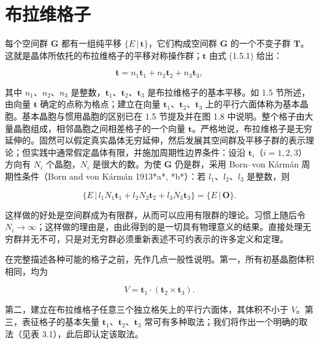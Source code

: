 \section{布拉维格子}

每个空间群 $\mathbf{G}$ 都有一组纯平移 $\{E \,|\, \mathbf{t}\}$，它们构成空间群 $\mathbf{G}$ 的一个不变子群 $\mathbf{T}$。这就是晶体所依托的布拉维格子的平移对称操作群；$\mathbf{t}$ 由式 (1.5.1) 给出：

\begin{equation*}
\mathbf{t} = n_{1}\mathbf{t}_{1} + n_{2}\mathbf{t}_{2} + n_{3}\mathbf{t}_{3},
\tag{1.5.1}
\end{equation*}

其中 $n_{1}$、$n_{2}$、$n_{3}$ 是整数，$\mathbf{t}_{1}$、$\mathbf{t}_{2}$、$\mathbf{t}_{3}$ 是布拉维格子的基本平移。如 1.5 节所述，由向量 $\mathbf{t}$ 确定的点称为格点；建立在向量 $\mathbf{t}_{1}$、$\mathbf{t}_{2}$、$\mathbf{t}_{3}$ 上的平行六面体称为基本晶胞。基本晶胞与惯用晶胞的区别已在 1.5 节提及并在图 1.8 中说明。整个格子由大量晶胞组成，相邻晶胞之间相差格子的一个向量 $\mathbf{t}$。严格地说，布拉维格子是无穷延伸的。固然可以假定真实晶体无穷延伸，然后发展其空间群及平移子群的表示理论；但实践中通常假定晶体有限，并施加周期性边界条件：设沿 $\mathbf{t}_{i}$（$i = 1, 2, 3$）方向有 $N_{i}$ 个晶胞，$N_{i}$ 是很大的数。为使 $\mathbf{G}$ 仍是群，采用 Born--von Kármán 周期性条件（Born and von Kármán 1913*a*, *b*）：若 $l_{1}$、$l_{2}$、$l_{3}$ 是整数，则

\begin{equation*}
\{E \,|\, l_{1}N_{1}\mathbf{t}_{1} + l_{2}N_{2}\mathbf{t}_{2} + l_{3}N_{3}\mathbf{t}_{3}\} = \{E \,|\, \mathbf{O}\}.
\tag{3.1.1}
\end{equation*}

这样做的好处是空间群成为有限群，从而可以应用有限群的理论。习惯上随后令 $N_{i} \rightarrow \infty$；这样做的理由是，由此得到的是一切具有物理意义的结果。直接处理无穷群并无不可，只是对无穷群必须重新表述不可约表示的许多定义和定理。

在完整描述各种可能的格子之前，先作几点一般性说明。第一，所有初基晶胞体积相同，均为

\begin{equation*}
V = \mathbf{t}_{1} \cdot (\mathbf{t}_{2} \times \mathbf{t}_{3}).
\tag{3.1.2}
\end{equation*}

第二，建立在布拉维格子任意三个独立格矢上的平行六面体，其体积不小于 $V$。第三，表征格子的基本矢量 $\mathbf{t}_{1}$、$\mathbf{t}_{2}$、$\mathbf{t}_{3}$ 常可有多种取法；我们将作出一个明确的取法（见表 3.1），此后即认定该取法。

